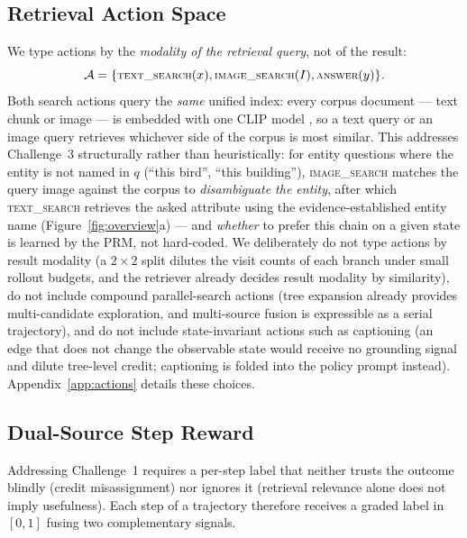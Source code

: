 \documentclass[letterpaper,twocolumn,10pt]{article}
\begin{document}
\subsection{Retrieval Action Space}
\label{sec:actions}

We type actions by the \emph{modality of the retrieval query}, not of the
result:
\begin{equation}
\small
\mathcal{A} = \{\textsc{text\_search}(x),
\textsc{image\_search}(I),
\textsc{answer}(y)\}.
\label{eq:actions}
\end{equation}
Both search actions query the \emph{same} unified index: every corpus
document --- text chunk or image --- is embedded with one CLIP model
\cite{radford2021clip}, so a text query or an image query retrieves
whichever side of the corpus is most similar. This addresses Challenge~3
structurally rather than heuristically: for entity questions where the
entity is not named in $q$ (``this bird'', ``this building''),
\textsc{image\_search} matches the query image against the corpus to
\emph{disambiguate the entity}, after which \textsc{text\_search} retrieves
the asked attribute using the evidence-established entity name
(Figure~\ref{fig:overview}a) --- and \emph{whether} to prefer this chain on
a given state is learned by the PRM, not hard-coded. We deliberately do not
type actions by result modality (a $2{\times}2$ split dilutes the visit
counts of each branch under small rollout budgets, and the retriever
already decides result modality by similarity), do not include compound
parallel-search actions (tree expansion already provides multi-candidate
exploration, and multi-source fusion is expressible as a serial
trajectory), and do not include state-invariant actions such as captioning
(an edge that does not change the observable state would receive no
grounding signal and dilute tree-level credit; captioning is folded into
the policy prompt instead). Appendix~\ref{app:actions} details these
choices.

\subsection{Dual-Source Step Reward}
\label{sec:reward}

Addressing Challenge~1 requires a per-step label that neither trusts the
outcome blindly (credit misassignment) nor ignores it (retrieval relevance
alone does not imply usefulness). Each step of a trajectory therefore
receives a graded label in $[0,1]$ fusing two complementary signals.
\end{document}
